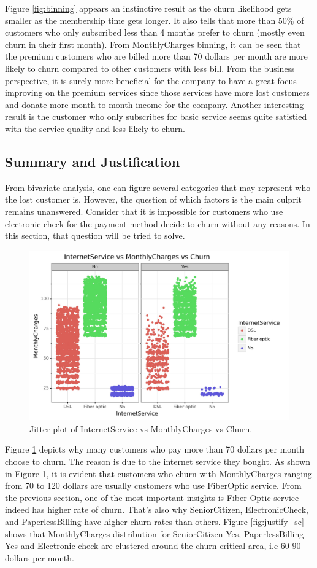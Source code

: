 Figure \ref{fig:binning} appears an instinctive result as the churn likelihood gets smaller as the membership time gets longer. It also tells that more than 50\% of customers who only subscribed less than 4 months prefer to churn (mostly even churn in their first month). From MonthlyCharges binning, it can be seen that the premium customers who are billed more than 70 dollars per month are more likely to churn compared to other customers with less bill. From the business perspective, it is surely more beneficial for the company to have a great focus improving on the premium services since those services have more lost customers and donate more month-to-month income for the company. Another interesting result is the customer who only subscribes for basic service seems quite satistied with the service quality and less likely to churn.

\subsection{Summary and Justification}
From bivariate analysis, one can figure several categories that may represent who the lost customer is. However, the question of which factors is the main culprit remains unanswered. Consider that it is impossible for customers who use electronic check for the payment method decide to churn without any reasons. In this section, that question will be tried to solve.
\begin{figure}[!htbp]
	\centering
	\includegraphics[width=0.7\linewidth]{figures/justifi_monthly}
	\caption{Jitter plot of InternetService vs MonthlyCharges vs Churn.}
	\label{fig:justify_monthly}
\end{figure}

Figure \ref{fig:justify_monthly} depicts why many customers who pay more than 70 dollars per month choose to churn. The reason is due to the internet service they bought.  As shown in Figure \ref{fig:justify_monthly}, it is evident that customers who churn with MonthlyCharges ranging from 70 to 120 dollars are usually customers who use FiberOptic service. From the previous section, one of the most important insights is Fiber Optic service indeed has higher rate of churn. That's also why SeniorCitizen, ElectronicCheck, and PaperlessBilling have higher churn rates than others. Figure \ref{fig:justify_sc} shows that MonthlyCharges distribution for SeniorCitizen Yes, PaperlessBilling Yes and Electronic check are clustered around the churn-critical area, i.e 60-90 dollars per month. 

